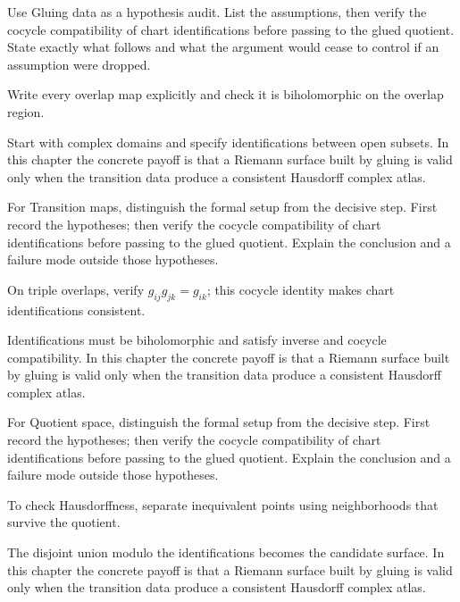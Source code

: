 \begin{exercise}\label{exr:iv25-01}
Use Gluing data as a hypothesis audit. List the assumptions, then verify the cocycle compatibility of chart identifications before passing to the glued quotient. State exactly what follows and what the argument would cease to control if an assumption were dropped.
\end{exercise}
\begin{hint}
Write every overlap map explicitly and check it is biholomorphic on the overlap region.
\end{hint}
\begin{solution}
Start with complex domains and specify identifications between open subsets. In this chapter the concrete payoff is that a Riemann surface built by gluing is valid only when the transition data produce a consistent Hausdorff complex atlas.
\end{solution}

\begin{exercise}\label{exr:iv25-02}
For Transition maps, distinguish the formal setup from the decisive step. First record the hypotheses; then verify the cocycle compatibility of chart identifications before passing to the glued quotient. Explain the conclusion and a failure mode outside those hypotheses.
\end{exercise}
\begin{hint}
On triple overlaps, verify \(g_{ij}g_{jk}=g_{ik}\); this cocycle identity makes chart identifications consistent.
\end{hint}
\begin{solution}
Identifications must be biholomorphic and satisfy inverse and cocycle compatibility. In this chapter the concrete payoff is that a Riemann surface built by gluing is valid only when the transition data produce a consistent Hausdorff complex atlas.
\end{solution}

\begin{exercise}\label{exr:iv25-03}
For Quotient space, distinguish the formal setup from the decisive step. First record the hypotheses; then verify the cocycle compatibility of chart identifications before passing to the glued quotient. Explain the conclusion and a failure mode outside those hypotheses.
\end{exercise}
\begin{hint}
To check Hausdorffness, separate inequivalent points using neighborhoods that survive the quotient.
\end{hint}
\begin{solution}
The disjoint union modulo the identifications becomes the candidate surface. In this chapter the concrete payoff is that a Riemann surface built by gluing is valid only when the transition data produce a consistent Hausdorff complex atlas.
\end{solution}

